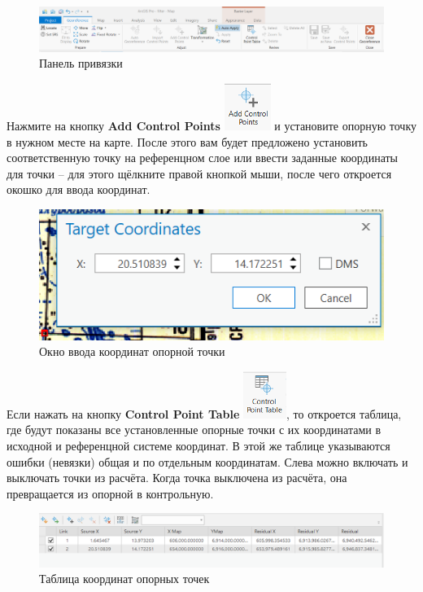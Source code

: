 \documentclass[
  12pt,
]{book}
\begin{document}
\begin{figure}
\centering
\includegraphics{images/Ref02/Arc_georef_panel.png}
\caption{Панель привязки}
\end{figure}

Нажмите на кнопку \textbf{Add Control Points} \includegraphics{images/Ref02/Arc_add_control_points.png} и установите опорную точку в нужном месте на карте. После этого вам будет предложено установить соответственную точку на референцном слое или ввести заданные координаты для точки -- для этого щёлкните правой кнопкой мыши, после чего откроется окошко для ввода координат.

\begin{figure}
\centering
\includegraphics{images/Ref02/Arc_target_coords.png}
\caption{Окно ввода координат опорной точки}
\end{figure}

Если нажать на кнопку \textbf{Control Point Table} \includegraphics{images/Ref02/Arc_control_points_tab.png}, то откроется таблица, где будут показаны все установленные опорные точки с их координатами в исходной и референцной системе координат. В этой же таблице указываются ошибки (невязки) общая и по отдельным координатам. Слева можно включать и выключать точки из расчёта. Когда точка выключена из расчёта, она превращается из опорной в контрольную.

\begin{figure}
\centering
\includegraphics{images/Ref02/Arc_table.png}
\caption{Таблица координат опорных точек}
\end{figure}
\end{document}
